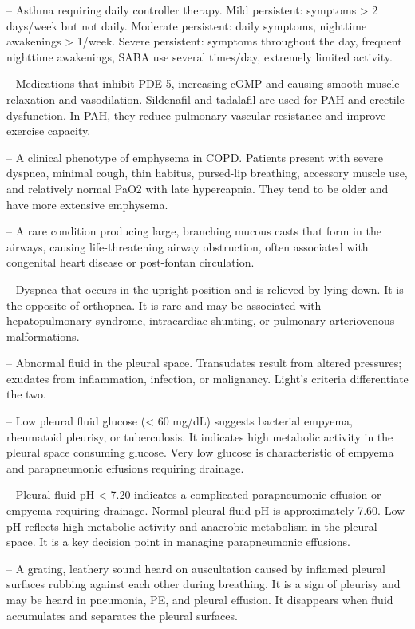 -- Asthma requiring daily controller therapy. Mild persistent: symptoms > 2 days/week but not daily. Moderate persistent: daily symptoms, nighttime awakenings > 1/week. Severe persistent: symptoms throughout the day, frequent nighttime awakenings, SABA use several times/day, extremely limited activity.

-- Medications that inhibit PDE-5, increasing cGMP and causing smooth muscle relaxation and vasodilation. Sildenafil and tadalafil are used for PAH and erectile dysfunction. In PAH, they reduce pulmonary vascular resistance and improve exercise capacity.

-- A clinical phenotype of emphysema in COPD. Patients present with severe dyspnea, minimal cough, thin habitus, pursed-lip breathing, accessory muscle use, and relatively normal PaO2 with late hypercapnia. They tend to be older and have more extensive emphysema.

-- A rare condition producing large, branching mucous casts that form in the airways, causing life-threatening airway obstruction, often associated with congenital heart disease or post-fontan circulation.

-- Dyspnea that occurs in the upright position and is relieved by lying down. It is the opposite of orthopnea. It is rare and may be associated with hepatopulmonary syndrome, intracardiac shunting, or pulmonary arteriovenous malformations.

-- Abnormal fluid in the pleural space. Transudates result from altered pressures; exudates from inflammation, infection, or malignancy. Light's criteria differentiate the two.

-- Low pleural fluid glucose (< 60 mg/dL) suggests bacterial empyema, rheumatoid pleurisy, or tuberculosis. It indicates high metabolic activity in the pleural space consuming glucose. Very low glucose is characteristic of empyema and parapneumonic effusions requiring drainage.

-- Pleural fluid pH < 7.20 indicates a complicated parapneumonic effusion or empyema requiring drainage. Normal pleural fluid pH is approximately 7.60. Low pH reflects high metabolic activity and anaerobic metabolism in the pleural space. It is a key decision point in managing parapneumonic effusions.

-- A grating, leathery sound heard on auscultation caused by inflamed pleural surfaces rubbing against each other during breathing. It is a sign of pleurisy and may be heard in pneumonia, PE, and pleural effusion. It disappears when fluid accumulates and separates the pleural surfaces.

